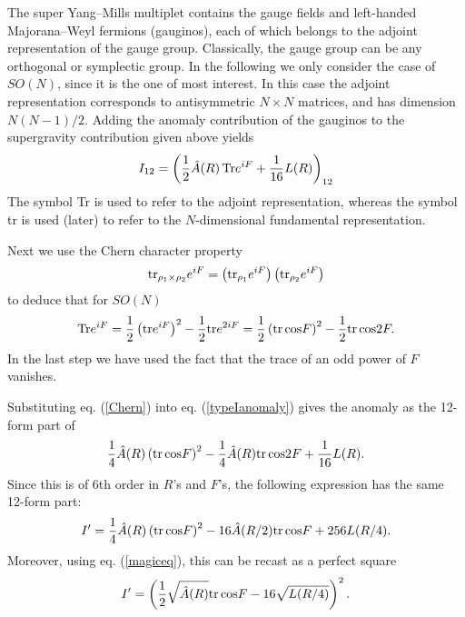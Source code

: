 \documentclass[a4paper,12pt]{article}
\begin{document}
The super Yang--Mills multiplet contains the gauge fields and
left-handed Majorana--Weyl fermions (gauginos), each of which belongs to the
adjoint representation of the gauge group. Classically, the gauge
group can be any orthogonal or symplectic group. In the following
we only consider the case of $SO(N)$, since it is the one of most
interest. In this case the adjoint representation corresponds to
antisymmetric $N \times N$ matrices, and has dimension $N(N-1)/2$.
Adding the anomaly contribution of the gauginos to the
supergravity contribution given above yields
\begin{equation} \label{typeIanomaly}
I_{12} = \left( {1\over2} \hat A (R)\, {\rm Tr} e^{iF} + {1 \over
16} L(R) \right)_{12}
\end{equation}
The symbol Tr is used to refer to the adjoint representation,
whereas the symbol tr is used (later) to refer to the
$N$-dimensional fundamental representation.

Next we use the Chern character property
\begin{equation}
{\rm tr}_{\rho_1 \times \rho_2} e^{iF} = \left({\rm tr}_{\rho_1 }
e^{iF} \right) \left( {\rm tr}_{\rho_2} e^{iF} \right)
\end{equation}
to deduce that for $SO(N)$
\begin{equation} \label{Chern}
{\rm Tr} e^{iF} = {1 \over 2} \left( {\rm tr} e^{iF} \right)^2 -
{1 \over 2} {\rm tr} e^{2iF} = {1 \over 2} \left( {\rm tr} \, {\rm
cos}  F \right)^2 - {1 \over 2} {\rm tr}\, {\rm cos} 2F.
\end{equation}
In the last step we have used the fact that the trace of an odd
power of $F$ vanishes.

Substituting eq. (\ref{Chern}) into eq. (\ref{typeIanomaly}) gives
the anomaly as the 12-form part of
\begin{equation}
 {1 \over 4}\hat A (R) \left( {\rm tr} \, {\rm
cos}  F \right)^2 - {1 \over 4} \hat A(R) {\rm tr}\, {\rm cos} 2F
+ {1 \over 16} L(R) .
\end{equation}
Since this is of 6th order in $R$'s and $F$'s, the following
expression has the same 12-form part:
\begin{equation}
I' = {1 \over 4}\hat A (R) \left( {\rm tr} \, {\rm cos}  F
\right)^2 - 16 \hat A(R/2) {\rm tr}\, {\rm cos} F + 256 L(R/4) .
\end{equation}
Moreover, using eq. (\ref{magiceq}), this can be recast as a
perfect square
\begin{equation}
I' = \left( {1 \over 2}\sqrt{\hat A (R)}  {\rm tr} \, {\rm cos} F
- 16 \sqrt{ L(R/4)} \right)^2 .
\end{equation}
\end{document}
